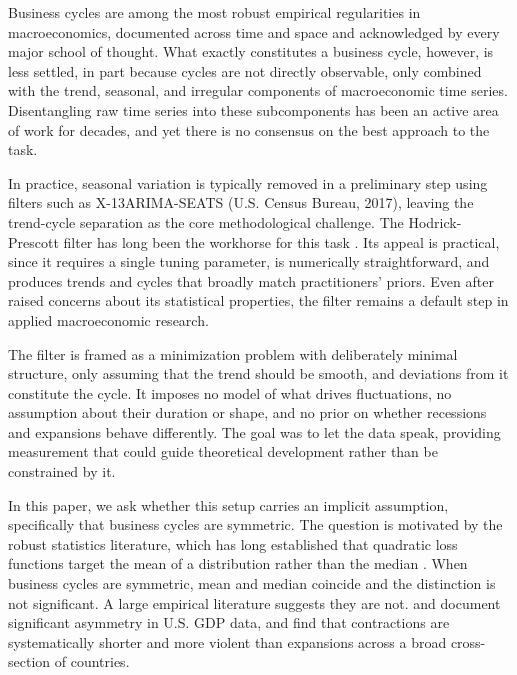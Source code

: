 \documentclass[10pt]{article}
\begin{document}
Business cycles are among the most robust empirical regularities in macroeconomics, documented across time and space and acknowledged by every major school of thought. What exactly constitutes a business cycle, however, is less settled, in part because cycles are not directly observable, only combined with the trend, seasonal, and irregular components of macroeconomic time series. Disentangling raw time series into these subcomponents has been an active area of work for decades, and yet there is no consensus on the best approach to the task.

In practice, seasonal variation is typically removed in a preliminary step using filters such as X-13ARIMA-SEATS (U.S. Census Bureau, 2017), leaving the trend-cycle separation as the core methodological challenge. The Hodrick-Prescott filter has long been the workhorse for this task \citep{hodrick_prescott1997}. Its appeal is practical, since it requires a single tuning parameter, is numerically straightforward, and produces trends and cycles that broadly match practitioners' priors. Even after \citet{hamilton2018} raised concerns about its statistical properties, the filter remains a default step in applied macroeconomic research.

The filter is framed as a minimization problem with deliberately minimal structure, only assuming that the trend should be smooth, and deviations from it constitute the cycle. It imposes no model of what drives fluctuations, no assumption about their duration or shape, and no prior on whether recessions and expansions behave differently. The goal was to let the data speak, providing measurement that could guide theoretical development rather than be constrained by it.

In this paper, we ask whether this setup carries an implicit assumption, specifically that business cycles are symmetric. The question is motivated by the robust statistics literature, which has long established that quadratic loss functions target the mean of a distribution rather than the median \citep{huber1964, koenker_bassett1978}. When business cycles are symmetric, mean and median coincide and the distinction is not significant. A large empirical literature suggests they are not. \citet{neftci1984} and \citet{sichel1993} document significant asymmetry in U.S. GDP data, and \citet{mckay_reis2008} find that contractions are systematically shorter and more violent than expansions across a broad cross-section of countries.
\end{document}
